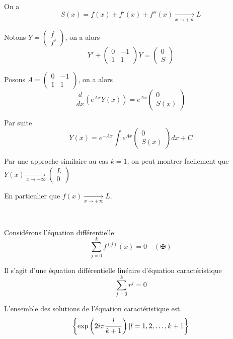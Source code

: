 \


On a
\[ S (x) = f (x) + f' (x) + f'' (x) \underset{x \rightarrow + \infty}{\to} L
\]


Notons $Y = \left( \begin{array}{c}
  f\\
  f'
\end{array} \right)$, on a alors
\[ Y' + \left( \begin{array}{cc}
     0 & - 1\\
     1 & 1
   \end{array} \right) Y = \left( \begin{array}{c}
     0\\
     S
   \end{array} \right) \]


Posons $A = \left( \begin{array}{cc}
  0 & - 1\\
  1 & 1
\end{array} \right)$, on a alors
\[ \frac{d}{d x} (e^{A x} Y (x)) = e^{A x} \left( \begin{array}{c}
     0\\
     S (x)
   \end{array} \right) \]


Par suite
\[ Y (x) = e^{- A x} \int e^{A x} \left( \begin{array}{c}
     0\\
     S (x)
   \end{array} \right) d x + C \]
\[ \  \]


Par une approche similaire au cas $k = 1$, on peut montrer facilement que $Y
(x) \underset{x \rightarrow + \infty}{\rightarrow} \left( \begin{array}{c}
  L\\
  0
\end{array} \right)$

En particulier que $f (x) \underset{x \rightarrow + \infty}{\rightarrow} L$.

\


Consid{\'e}rons l'{\'e}quation diff{\'e}rentielle
\[ \sum_{j = 0}^k f^{(j)} (x) = 0 \quad  (\maltese) \]


Il s'agit d'une {\'e}quation diff{\'e}rentielle lin{\'e}aire d'{\'e}quation
caract{\'e}ristique
\[ \sum_{j = 0}^k r^j = 0 \]


L'ensemble des solutions de l'{\'e}quation caract{\'e}ristique est
\[ \left\{ \exp \left( 2 i \pi \frac{l}{k + 1} \right) | l = 1, 2, \ldots, k +
   1  \right\} \]


